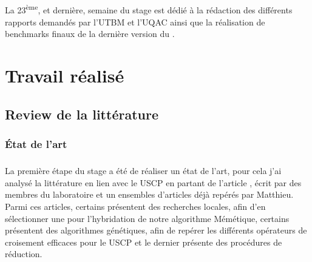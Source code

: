 \documentclass[a4paper,11pt,twoside,french,report]{../common/simplem}
\begin{document}
				\paragraph*{}
					La 23\textsuperscript{ème}, et dernière, semaine du stage est dédié à la rédaction des différents rapports demandés par l'\gls{UTBM} et l'\gls{UQAC} ainsi que la réalisation de benchmarks finaux de la dernière version du \solver{}.
	\chapter{Travail réalisé}\label{sec:work}
		\section{Review de la littérature}\label{sec:review_litterature}
			\subsection{État de l'art}
				\paragraph*{}
					La première étape du stage a été de réaliser un état de l'art, pour cela j'ai analysé la littérature en lien avec le \gls{USCP} en partant de l'article , écrit par des membres du laboratoire et un ensembles d'articles déjà repérés par Matthieu. Parmi ces articles, certains présentent des recherches locales, afin d'en sélectionner une pour l'hybridation de notre algorithme Mémétique, certains présentent des algorithmes génétiques, afin de repérer les différents opérateurs de croisement efficaces pour le \gls{USCP} et le dernier présente des procédures de réduction.
\end{document}
